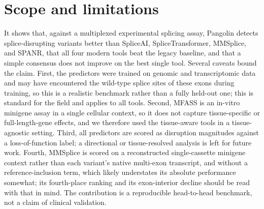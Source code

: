 \documentclass[11pt]{article}
\let\oldsection\section
\renewcommand{\section}{\Needspace*{7\baselineskip}\oldsection}
\begin{document}
\section{Scope and limitations}
It shows that, against a multiplexed experimental splicing assay, Pangolin detects
splice-disrupting variants better than SpliceAI, SpliceTransformer, MMSplice, and SPANR, that
all four modern tools beat the legacy baseline, and that a simple consensus does not
improve on the best single tool. Several caveats bound the claim. First, the
predictors were trained on genomic and transcriptomic data and may have encountered
the wild-type splice sites of these exons during training, so this is a realistic
benchmark rather than a fully held-out one; this is standard for the field and
applies to all tools. Second, MFASS is an in-vitro minigene assay in a single
cellular context, so it does not capture tissue-specific or full-length-gene
effects, and we therefore used the tissue-aware tools in a tissue-agnostic setting.
Third, all predictors are scored as disruption magnitudes against a loss-of-function
label; a directional or tissue-resolved analysis is left for future work. Fourth,
MMSplice is scored on a reconstructed single-cassette minigene context rather than
each variant's native multi-exon transcript, and without a reference-inclusion term,
which likely understates its absolute performance somewhat; its fourth-place ranking
and its exon-interior decline should be read with that in mind. The
contribution is a reproducible head-to-head benchmark, not a claim of clinical validation.
\end{document}
